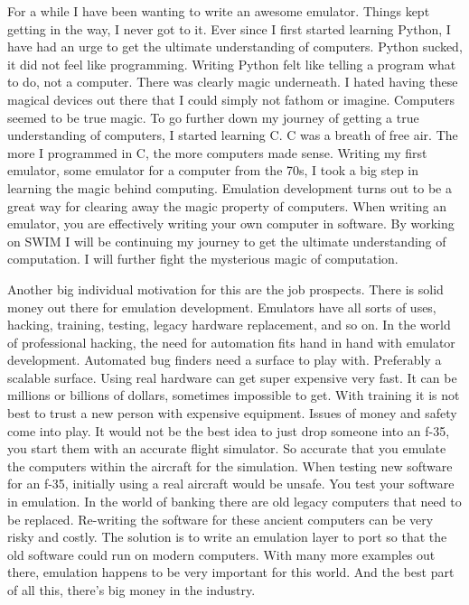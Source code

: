\documentclass[
    paper=letter,
    parskip=half,
    fontsize=12pt,
    titlepage=firstiscover,
    toc=bibliography,
    numbers=endperiod
]{scrartcl}
\begin{document}
For a while I have been wanting to write an awesome emulator. Things kept getting in the way, I never got to it. Ever since I first started learning Python, I have had an urge to get the ultimate understanding of computers. Python sucked, it did not feel like programming. Writing Python felt like telling a program what to do, not a computer. There was clearly magic underneath. I hated having these magical devices out there that I could simply not fathom or imagine. Computers seemed to be true magic. To go further down my journey of getting a true understanding of computers, I started learning C. C was a breath of free air. The more I programmed in C, the more computers made sense. Writing my first emulator, some emulator for a computer from the 70s, I took a big step in learning the magic behind computing. Emulation development turns out to be a great way for clearing away the magic property of computers. When writing an emulator, you are effectively writing your own computer in software. By working on SWIM I will be continuing my journey to get the ultimate understanding of computation. I will further fight the mysterious magic of computation.

Another big individual motivation for this are the job prospects. There is solid money out there for emulation development. Emulators have all sorts of uses, hacking, training, testing, legacy hardware replacement, and so on. In the world of professional hacking, the need for automation fits hand in hand with emulator development. Automated bug finders need a surface to play with. Preferably a scalable surface. Using real hardware can get super expensive very fast. It can be millions or billions of dollars, sometimes impossible to get. With training it is not best to trust a new person with expensive equipment. Issues of money and safety come into play. It would not be the best idea to just drop someone into an f-35, you start them with an accurate flight simulator. So accurate that you emulate the computers within the aircraft for the simulation. When testing new software for an f-35, initially using a real aircraft would be unsafe. You test your software in emulation. In the world of banking there are old legacy computers that need to be replaced. Re-writing the software for these ancient computers can be very risky and costly. The solution is to write an emulation layer to port so that the old software could run on modern computers. With many more examples out there, emulation happens to be very important for this world. And the best part of all this, there's big money in the industry.
\end{document}

